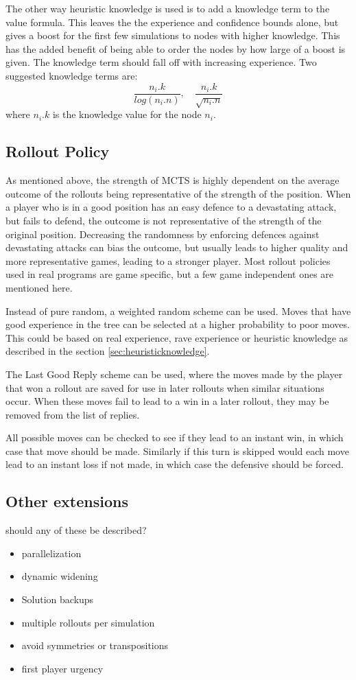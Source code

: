 The other way heuristic knowledge is used is to add a knowledge term to the value formula. This leaves the the experience and confidence bounds alone, but gives a boost for the first few simulations to nodes with higher knowledge. This has the added benefit of being able to order the nodes by how large of a boost is given. The knowledge term should fall off with increasing experience. Two suggested knowledge terms are: $$\frac{n_i.k}{log(n_i.n)}, \quad \frac{n_i.k}{\sqrt{n_i.n}}$$ where $n_i.k$ is the knowledge value for the node $n_i$.


\subsection{Rollout Policy}

As mentioned above, the strength of MCTS is highly dependent on the average outcome of the rollouts being representative of the strength of the position. When a player who is in a good position has an easy defence to a devastating attack, but fails to defend, the outcome is not representative of the strength of the original position. Decreasing the randomness by enforcing defences against devastating attacks can bias the outcome, but usually leads to higher quality and more representative games, leading to a stronger player. Most rollout policies used in real programs are game specific, but a few game independent ones are mentioned here.

Instead of pure random, a weighted random scheme can be used. Moves that have good experience in the tree can be selected at a higher probability to poor moves. This could be based on real experience, rave experience or heuristic knowledge as described in the section \ref{sec:heuristicknowledge}.

The Last Good Reply scheme can be used, where the moves made by the player that won a rollout are saved for use in later rollouts when similar situations occur. When these moves fail to lead to a win in a later rollout, they may be removed from the list of replies.

All possible moves can be checked to see if they lead to an instant win, in which case that move should be made. Similarly if this turn is skipped would each move lead to an instant loss if not made, in which case the defensive should be forced.



\subsection{Other extensions}

should any of these be described?

\begin{itemize}
\item parallelization
\item dynamic widening
\item Solution backups
\item multiple rollouts per simulation
\item avoid symmetries or transpositions
\item first player urgency
\end{itemize}

